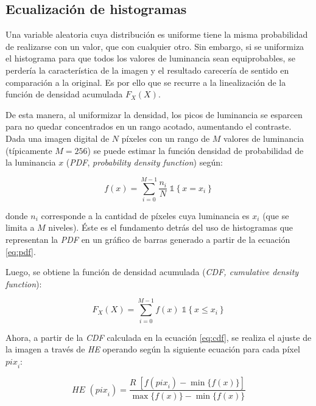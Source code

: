 
\subsection{Ecualización de histogramas}

Una variable aleatoria cuya distribución es uniforme tiene la misma probabilidad
de realizarse con un valor, que con cualquier otro. Sin embargo, si se
uniformiza el histograma para que todos los valores de luminancia sean
equiprobables, se perdería la característica de la imagen y el resultado
carecería de sentido en comparación a la original. Es por ello que se
recurre a la linealización de la función de densidad acumulada $F_X(X)$.

De esta manera, al uniformizar la densidad, los picos de luminancia se esparcen
para no quedar concentrados en un rango acotado, aumentando el contraste. \\

Dada una imagen digital de $N$ píxeles con un rango de $M$ valores de luminancia
(típicamente $M=256$) se puede estimar la función densidad de probabilidad de
la luminancia $x$ (\emph{PDF}, \emph{probability density function}) según:

\begin{equation} \label{eq:pdf}
	f(x) = \sum_{i=0}^{M-1} \frac{n_i}{N} \; \mathds{1} \left\{ x = x_i \right\}
\end{equation}

donde $n_i$ corresponde a la cantidad de píxeles cuya luminancia es $x_i$ (que
se limita a $M$ niveles). Éste es el fundamento detrás del uso de histogramas
que representan la \emph{PDF} en un gráfico de barras generado a partir de la
ecuación \eqref{eq:pdf}.

Luego, se obtiene la función de densidad acumulada (\emph{CDF, cumulative
density function}):

\begin{equation} \label{eq:cdf}
	F_X(X) = \sum_{i=0}^{M-1} f(x) \; \mathds{1} \left\{ x \leq x_i \right\}
\end{equation}

Ahora, a partir de la \emph{CDF} calculada en la ecuación \eqref{eq:cdf}, se
realiza el ajuste de la imagen a través de \emph{HE} operando según la siguiente
ecuación para cada píxel ${pix}_i$:

\begin{equation} \label{eq:he_full}
	\textit{HE } ({pix}_i) = \frac{R \; \left[f({pix}_i) - \min\{f(x)\}\right]}{\max\{f(x)\}-\min\{f(x)\}}
\end{equation}

